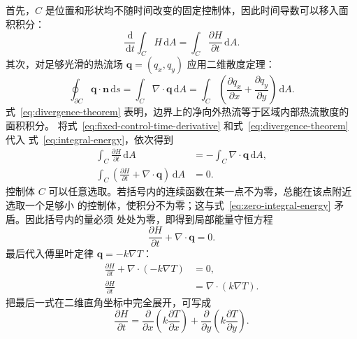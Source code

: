 \documentclass[UTF8,11pt]{ctexart}
\numberwithin{equation}{section}
\newcommand{\dd}{\,\mathrm d}
\begin{document}
首先，$C$ 是位置和形状均不随时间改变的固定控制体，因此时间导数可以移入面积积分：
\begin{equation}
      \frac{\dd}{\dd t}\int_C H\dd A
      =\int_C\frac{\partial H}{\partial t}\dd A.
      \label{eq:fixed-control-time-derivative}
\end{equation}
其次，对足够光滑的热流场 $\bm q=(q_x,q_y)$ 应用二维散度定理：
\begin{equation}
      \oint_{\partial C}\bm q\cdot\bm n\dd s
      =\int_C\nabla\cdot\bm q\dd A
      =\int_C\left(
      \frac{\partial q_x}{\partial x}
      +\frac{\partial q_y}{\partial y}
      \right)\dd A.
      \label{eq:divergence-theorem}
\end{equation}
式~\eqref{eq:divergence-theorem} 表明，边界上的净向外热流等于区域内部热流散度的面积积分。
将式~\eqref{eq:fixed-control-time-derivative} 和式~\eqref{eq:divergence-theorem} 代入
式~\eqref{eq:integral-energy}，依次得到
\begin{align}
      \int_C\frac{\partial H}{\partial t}\dd A
      &=-\int_C\nabla\cdot\bm q\dd A,
      \label{eq:integral-energy-after-divergence}\\
      \int_C\left(
      \frac{\partial H}{\partial t}
      +\nabla\cdot\bm q
      \right)\dd A
      &=0.
      \label{eq:zero-integral-energy}
\end{align}
控制体 $C$ 可以任意选取。若括号内的连续函数在某一点不为零，总能在该点附近选取一个足够小
的控制体，使积分不为零；这与式~\eqref{eq:zero-integral-energy} 矛盾。因此括号内的量必须
处处为零，即得到局部能量守恒方程
\begin{equation}
      \frac{\partial H}{\partial t}
      +\nabla\cdot\bm q=0.
      \label{eq:local-energy-conservation}
\end{equation}
最后代入傅里叶定律 $\bm q=-k\nabla T$：
\begin{align}
      \frac{\partial H}{\partial t}
      +\nabla\cdot(-k\nabla T)&=0,
      \label{eq:substitute-fourier-law}\\
      \frac{\partial H}{\partial t}
      &=\nabla\cdot(k\nabla T).
      \label{eq:enthalpy-pde}
\end{align}
把最后一式在二维直角坐标中完全展开，可写成
\begin{equation}
      \frac{\partial H}{\partial t}
      =
      \frac{\partial}{\partial x}
      \left(k\frac{\partial T}{\partial x}\right)
      +
      \frac{\partial}{\partial y}
      \left(k\frac{\partial T}{\partial y}\right).
      \label{eq:enthalpy-pde-2d}
\end{equation}
\end{document}
